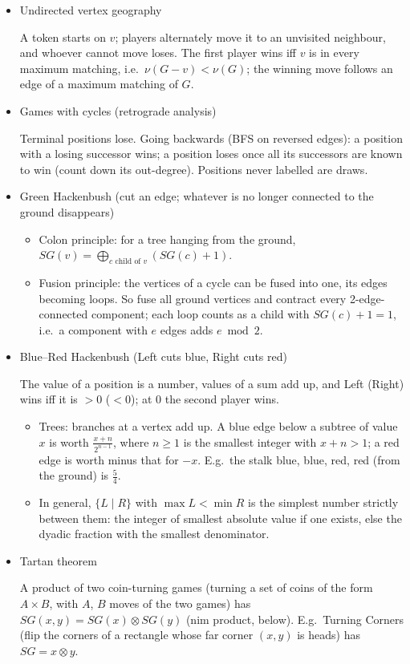 \begin{itemize}
\item Undirected vertex geography

A token starts on $v$; players alternately move it to an unvisited neighbour, and whoever cannot move loses. The first player wins iff $v$ is in every maximum matching, i.e.\ $\nu(G - v) < \nu(G)$; the winning move follows an edge of a maximum matching of $G$.

\item Games with cycles (retrograde analysis)

Terminal positions lose. Going backwards (BFS on reversed edges): a position with a losing successor wins; a position loses once all its successors are known to win (count down its out-degree). Positions never labelled are draws.

\item Green Hackenbush (cut an edge; whatever is no longer connected to the ground disappears)
\begin{itemize}
  \item Colon principle: for a tree hanging from the ground, $SG(v) = \bigoplus_{c \text{ child of } v} (SG(c) + 1)$.
  \item Fusion principle: the vertices of a cycle can be fused into one, its edges becoming loops. So fuse all ground vertices and contract every 2-edge-connected component; each loop counts as a child with $SG(c) + 1 = 1$, i.e.\ a component with $e$ edges adds $e \bmod 2$.
\end{itemize}

\item Blue–Red Hackenbush (Left cuts blue, Right cuts red)

The value of a position is a number, values of a sum add up, and Left (Right) wins iff it is $> 0$ ($< 0$); at $0$ the second player wins.
\begin{itemize}
  \item Trees: branches at a vertex add up. A blue edge below a subtree of value $x$ is worth $\frac{x + n}{2^{n-1}}$, where $n \ge 1$ is the smallest integer with $x + n > 1$; a red edge is worth minus that for $-x$. E.g.\ the stalk blue, blue, red, red (from the ground) is $\frac 5 4$.
  \item In general, $\{L \mid R\}$ with $\max L < \min R$ is the simplest number strictly between them: the integer of smallest absolute value if one exists, else the dyadic fraction with the smallest denominator.
\end{itemize}

\item Tartan theorem

A product of two coin-turning games (turning a set of coins of the form $A \times B$, with $A$, $B$ moves of the two games) has $SG(x, y) = SG(x) \otimes SG(y)$ (nim product, below). E.g.\ Turning Corners (flip the corners of a rectangle whose far corner $(x, y)$ is heads) has $SG = x \otimes y$.
\end{itemize}
